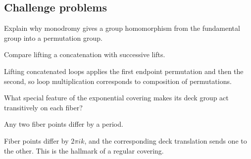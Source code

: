 \subsection*{Challenge problems}

\begin{exercise}\label{exr:iv23-expand-15}
Explain why monodromy gives a group homomorphism from the fundamental group into a permutation group.
\end{exercise}
\begin{hint}
Compare lifting a concatenation with successive lifts.
\end{hint}
\begin{solution}
Lifting concatenated loops applies the first endpoint permutation and then the second, so loop multiplication corresponds to composition of permutations.
\end{solution}

\begin{exercise}\label{exr:iv23-expand-16}
What special feature of the exponential covering makes its deck group act transitively on each fiber?
\end{exercise}
\begin{hint}
Any two fiber points differ by a period.
\end{hint}
\begin{solution}
Fiber points differ by \(2\pi i k\), and the corresponding deck translation sends one to the other. This is the hallmark of a regular covering.
\end{solution}

